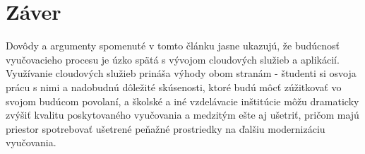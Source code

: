 \documentclass[10pt,slovak,a4paper]{article}%
\begin{document}
\section{Záver}

Dovôdy a argumenty spomenuté v tomto článku jasne ukazujú, že budúcnosť vyučovacieho procesu je úzko spätá s vývojom cloudových služieb a aplikácií. Využívanie cloudových služieb prináša výhody obom stranám - študenti si osvoja prácu s nimi a nadobudnú dôležité skúsenosti, ktoré budú môcť zúžitkovať vo svojom budúcom povolaní, a školské a iné vzdelávacie inštitúcie môžu dramaticky zvýšiť kvalitu poskytovaného vyučovania a medzitým ešte aj ušetriť, pričom majú priestor spotrebovať ušetrené peňažné prostriedky na ďalšiu modernizáciu vyučovania.





\end{document}
